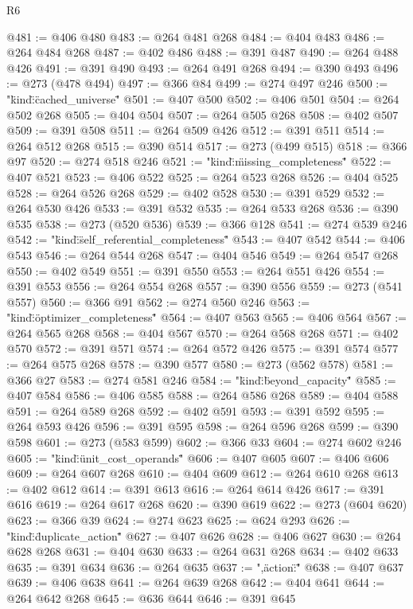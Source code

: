 \begin{lexlean}{R6}
\begin{coremodule}
{{{@481 := @406 @480
@483 := @264 @481 @268
@484 := @404 @483
@486 := @264 @484 @268
@487 := @402 @486
@488 := @391 @487
@490 := @264 @488 @426
@491 := @391 @490
@493 := @264 @491 @268
@494 := @390 @493
@496 := @273 (@478 @494)
@497 := @366 @84
@499 := @274 @497 @246
@500 := "{\"kind\":\"cached_universe\""
@501 := @407 @500
@502 := @406 @501
@504 := @264 @502 @268
@505 := @404 @504
@507 := @264 @505 @268
@508 := @402 @507
@509 := @391 @508
@511 := @264 @509 @426
@512 := @391 @511
@514 := @264 @512 @268
@515 := @390 @514
@517 := @273 (@499 @515)
@518 := @366 @97
@520 := @274 @518 @246
@521 := "{\"kind\":\"missing_completeness\""
@522 := @407 @521
@523 := @406 @522
@525 := @264 @523 @268
@526 := @404 @525
@528 := @264 @526 @268
@529 := @402 @528
@530 := @391 @529
@532 := @264 @530 @426
@533 := @391 @532
@535 := @264 @533 @268
@536 := @390 @535
@538 := @273 (@520 @536)
@539 := @366 @128
@541 := @274 @539 @246
@542 := "{\"kind\":\"self_referential_completeness\""
@543 := @407 @542
@544 := @406 @543
@546 := @264 @544 @268
@547 := @404 @546
@549 := @264 @547 @268
@550 := @402 @549
@551 := @391 @550
@553 := @264 @551 @426
@554 := @391 @553
@556 := @264 @554 @268
@557 := @390 @556
@559 := @273 (@541 @557)
@560 := @366 @91
@562 := @274 @560 @246
@563 := "{\"kind\":\"optimizer_completeness\""
@564 := @407 @563
@565 := @406 @564
@567 := @264 @565 @268
@568 := @404 @567
@570 := @264 @568 @268
@571 := @402 @570
@572 := @391 @571
@574 := @264 @572 @426
@575 := @391 @574
@577 := @264 @575 @268
@578 := @390 @577
@580 := @273 (@562 @578)
@581 := @366 @27
@583 := @274 @581 @246
@584 := "{\"kind\":\"beyond_capacity\""
@585 := @407 @584
@586 := @406 @585
@588 := @264 @586 @268
@589 := @404 @588
@591 := @264 @589 @268
@592 := @402 @591
@593 := @391 @592
@595 := @264 @593 @426
@596 := @391 @595
@598 := @264 @596 @268
@599 := @390 @598
@601 := @273 (@583 @599)
@602 := @366 @33
@604 := @274 @602 @246
@605 := "{\"kind\":\"unit_cost_operands\""
@606 := @407 @605
@607 := @406 @606
@609 := @264 @607 @268
@610 := @404 @609
@612 := @264 @610 @268
@613 := @402 @612
@614 := @391 @613
@616 := @264 @614 @426
@617 := @391 @616
@619 := @264 @617 @268
@620 := @390 @619
@622 := @273 (@604 @620)
@623 := @366 @39
@624 := @274 @623
@625 := @624 @293
@626 := "{\"kind\":\"duplicate_action\""
@627 := @407 @626
@628 := @406 @627
@630 := @264 @628 @268
@631 := @404 @630
@633 := @264 @631 @268
@634 := @402 @633
@635 := @391 @634
@636 := @264 @635
@637 := ",\"action\":\""
@638 := @407 @637
@639 := @406 @638
@641 := @264 @639 @268
@642 := @404 @641
@644 := @264 @642 @268
@645 := @636 @644
@646 := @391 @645
}}}}}}}}}}
\end{coremodule}
\end{lexlean}

